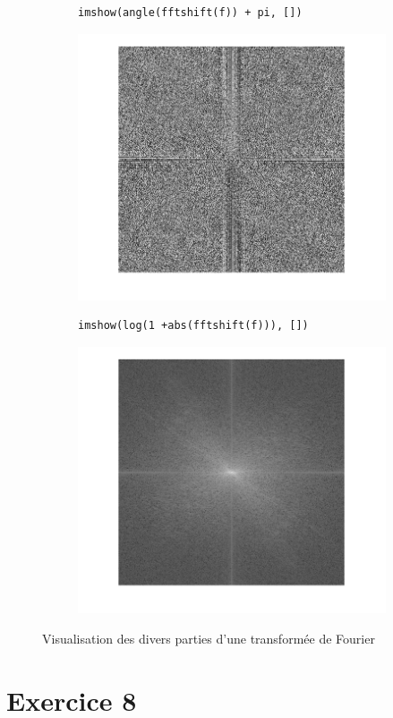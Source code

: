 \documentclass[12pt,a4paper,onecolumn]{article}
\begin{document}
\begin{figure}
\begin{subfigure}[b]{0.45\textwidth}
		\label{7_42}
	\end{subfigure}
	\begin{subfigure}[b]{0.45\textwidth}
		\centering
		\begin{lstlisting}[frame = none, numbers = none]
imshow(angle(fftshift(f)) + pi, [])
		\end{lstlisting}
		\includegraphics[scale = 1, width = \textwidth]{7_43}
		\label{7_43}
	\end{subfigure}
	\begin{subfigure}[b]{0.45\textwidth}
		\centering
		\begin{lstlisting}[frame = none, numbers = none]
imshow(log(1 +abs(fftshift(f))), [])
		\end{lstlisting}
		\includegraphics[scale = 1, width = \textwidth]{7_44}
		\label{7_44}
	\end{subfigure}
	\caption{Visualisation des divers parties d'une transformée de Fourier}
	\label{}
\end{figure}

\clearpage

\section{Exercice 8}
\end{document}
